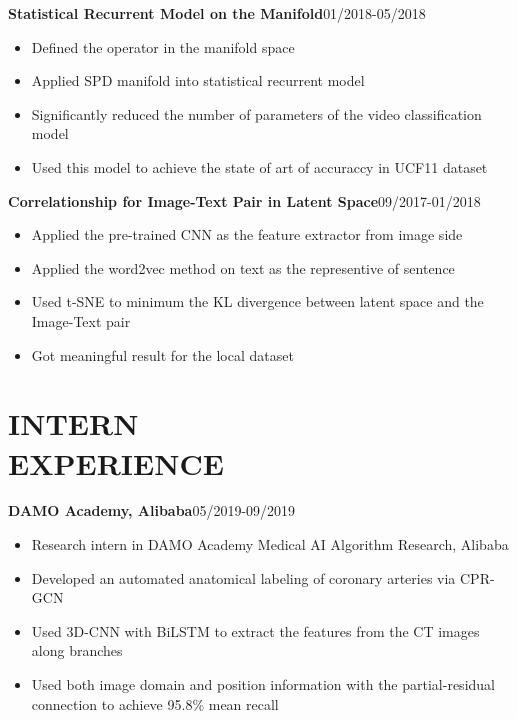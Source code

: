 \documentclass[margin]{res}
\begin{document}
\begin{resume}
                 \textbf{Statistical Recurrent Model on the Manifold}\hfill 01/2018-05/2018
                \begin{itemize}\itemsep -2.2pt %
                 \item Defined the operator in the manifold space
                 \item Applied SPD manifold into statistical recurrent model
                 \item Significantly reduced the number of parameters of the video classification model
                 \item Used this model to achieve the state of art of accuraccy in UCF11 dataset
                 \end{itemize}

                 \textbf{Correlationship for Image-Text Pair in Latent Space}\hfill 09/2017-01/2018
                \begin{itemize}\itemsep -2.2pt %
                 \item Applied the pre-trained CNN as the feature extractor from image side 
                 \item Applied the word2vec method on text as the representive of sentence
                 \item Used t-SNE to minimum the KL divergence between latent space and the Image-Text pair
                 \item Got meaningful result for the local dataset
                 \end{itemize}

\section{INTERN \\ EXPERIENCE}
                \textbf{DAMO Academy, Alibaba}\hfill 05/2019-09/2019
                \begin{itemize}\itemsep -2.2pt %
                 \item Research intern in DAMO Academy Medical AI Algorithm Research, Alibaba
                 \item Developed an automated anatomical labeling of coronary arteries via CPR-GCN
                 \item Used 3D-CNN with BiLSTM to extract the features from the CT images along branches
                 \item Used both image domain and position information with the partial-residual connection to achieve 95.8\% mean recall
                 \end{itemize}

\end{resume}
\end{document}

